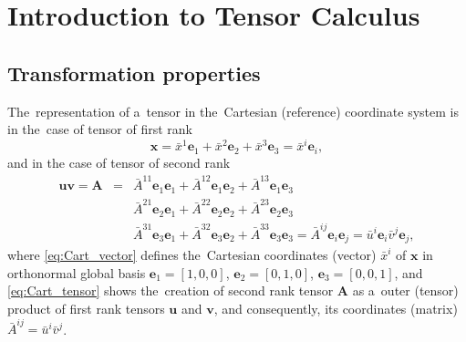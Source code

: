 \documentclass[preprint,12pt]{elsarticle}
\newcommand{\vect}[1]{\boldsymbol{#1}}
\newcommand{\matr}[1]{\mathbf{#1}}
\begin{document}
\tableofcontents
\section{Introduction to Tensor Calculus}
\subsection{Transformation properties} 
The~representation of a~tensor in the~Cartesian (reference) coordinate
system is in the~case of tensor of first rank
\begin{equation}
  \vect{x} = \bar{x}^1 \vect{e}_1 + \bar{x}^2 \vect{e}_2 + 
  \bar{x}^3 \vect{e}_3 = \bar{x}^i \vect{e}_i ,
  \label{eq:Cart_vector}
\end{equation}
and in the case of tensor of second rank
\begin{eqnarray}
  \vect{u}\vect{v} = \matr{A} &=& 
  \bar{A}^{11} \vect{e}_1\vect{e}_1  + \bar{A}^{12} \vect{e}_1\vect{e}_2 
  + \bar{A}^{13} \vect{e}_1\vect{e}_3 \nonumber\\
  && \bar{A}^{21} \vect{e}_2\vect{e}_1  + \bar{A}^{22} \vect{e}_2\vect{e}_2 
  + \bar{A}^{23} \vect{e}_2\vect{e}_3\nonumber\\
  && \bar{A}^{31} \vect{e}_3\vect{e}_1  + \bar{A}^{32} \vect{e}_3\vect{e}_2 
  + \bar{A}^{33} \vect{e}_3\vect{e}_3 = \bar{A}^{ij}\vect{e}_i\vect{e}_j 
  = \bar{u}^i\vect{e}_i \bar{v}^j\vect{e}_j ,
  \label{eq:Cart_tensor}
\end{eqnarray}  
where \eqref{eq:Cart_vector} defines the~Cartesian coordinates (vector) 
$\bar{x}^i$ of $\vect{x}$  in orthonormal global basis 
$\vect{e}_1 = [1, 0, 0]$, $\vect{e}_2 = [0, 1, 0]$,
$\vect{e}_3 = [0, 0, 1]$, and \eqref{eq:Cart_tensor} shows the~creation of
second rank tensor $\matr{A}$ as a~outer (tensor) product of first rank tensors
$\vect{u}$ and $\vect{v}$, 
and consequently, its coordinates (matrix) $\bar{A}^{ij} = \bar{u}^i \bar{v}^j$.
\end{document}
